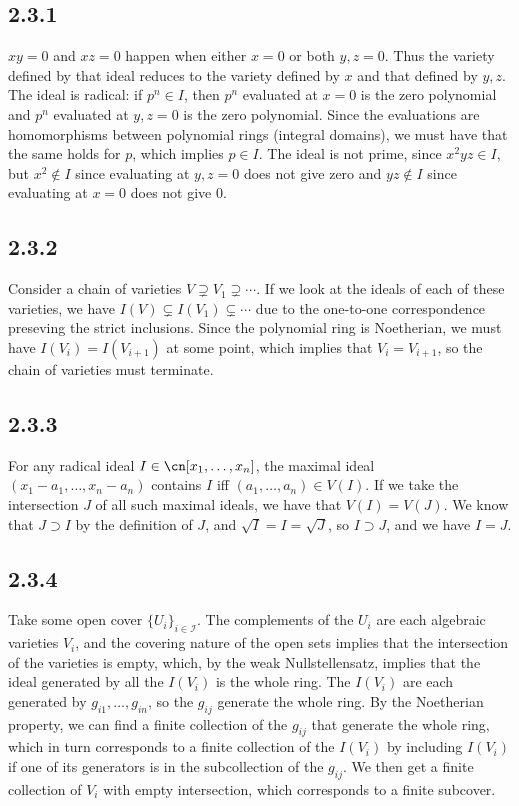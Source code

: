 \documentclass{article}
\begin{document}
\subsection*{2.3.1}
$xy=0$ and $xz=0$ happen when either $x=0$ or both $y,z=0$. Thus the variety defined by that ideal reduces to the variety defined by $x$ and that defined by $y,z$. The ideal is radical: if $p^n\in I$, then $p^n$ evaluated at $x=0$ is the zero polynomial and $p^n$ evaluated at $y,z=0$ is the zero polynomial. Since the evaluations are homomorphisms between polynomial rings (integral domains), we must have that the same holds for $p$, which implies $p\in I$. The ideal is not prime, since $x^2yz\in I$, but $x^2\not\in I$ since evaluating at $y,z=0$ does not give zero and $yz\not\in I$ since evaluating at $x=0$ does not give $0$.
\subsection*{2.3.2}
Consider a chain of varieties $V\supsetneq V_1\supsetneq\cdots$. If we look at the ideals of each of these varieties, we have $I(V)\subsetneq I(V_1)\subsetneq\cdots$ due to the one-to-one correspondence preseving the strict inclusions. Since the polynomial ring is Noetherian, we must have $I(V_i)=I(V_{i+1})$ at some point, which implies that $V_i=V_{i+1}$, so the chain of varieties must terminate.
\subsection*{2.3.3}
For any radical ideal $I\in\cn[x_1,\ldots,x_n]$, the maximal ideal $(x_1-a_1,\ldots,x_n-a_n)$ contains $I$ iff $(a_1,\ldots,a_n)\in V(I)$. If we take the intersection $J$ of all such maximal ideals, we have that $V(I)=V(J)$. We know that $J\supset I$ by the definition of $J$, and $\sqrt{I}=I=\sqrt{J}$, so $I\supset J$, and we have $I=J$.
\subsection*{2.3.4}
Take some open cover $\{U_i\}_{i\in\mathscr{I}}$. The complements of the $U_i$ are each algebraic varieties $V_i$, and the covering nature of the open sets implies that the intersection of the varieties is empty, which, by the weak Nullstellensatz, implies that the ideal generated by all the $I(V_i)$ is the whole ring. The $I(V_i)$ are each generated by $g_{i1},\ldots,g_{in}$, so the $g_{ij}$ generate the whole ring. By the Noetherian property, we can find a finite collection of the $g_{ij}$ that generate the whole ring, which in turn corresponds to a finite collection of the $I(V_i)$ by including $I(V_i)$ if one of its generators is in the subcollection of the $g_{ij}$. We then get a finite collection of $V_i$ with empty intersection, which corresponds to a finite subcover.
\end{document}
